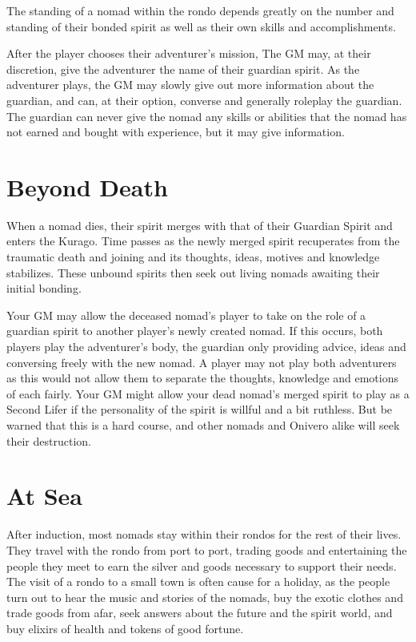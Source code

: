 The standing of a nomad within the rondo depends greatly on the number and standing of their bonded spirit as
well as their  own skills and accomplishments.

After the player chooses their adventurer's mission, The GM may, at their discretion, give the adventurer the name of their guardian spirit. As the adventurer plays, the GM may slowly give out more information about the guardian, and can, at their option, converse and generally roleplay the guardian. The guardian can never give the nomad any skills or abilities that the nomad has not earned and bought with experience, but it may give information.

\section{Beyond Death}

When a nomad dies, their spirit merges with that of their Guardian Spirit and enters the Kurago. Time passes as the newly merged spirit recuperates from the traumatic death and joining and its thoughts, ideas, motives and knowledge stabilizes. These unbound spirits then seek out living nomads awaiting their initial bonding.

Your GM may allow the deceased nomad's player to take on the role of a guardian spirit to another player's newly created nomad. If this occurs, both players play the adventurer's body, the guardian only providing advice, ideas and conversing freely with the new nomad. A player may not play both adventurers as this would not allow them to separate the thoughts, knowledge and emotions of each fairly. Your GM might allow your dead nomad's merged spirit to play as a Second Lifer if the personality of the spirit is willful and a bit ruthless. But be warned that this is a hard course, and other nomads and Onivero alike will seek their destruction.

\section{At Sea}

After induction, most nomads stay within their rondos for the rest of their lives. They travel with the rondo from port to port, trading goods and entertaining the people they meet to earn the silver and goods necessary to support their needs. The visit of a rondo to a small town is often cause for a holiday, as the people turn out to hear the music and stories of the nomads, buy the exotic clothes and trade goods from afar, seek answers about the future and the spirit world, and buy elixirs of health and tokens of good fortune.

